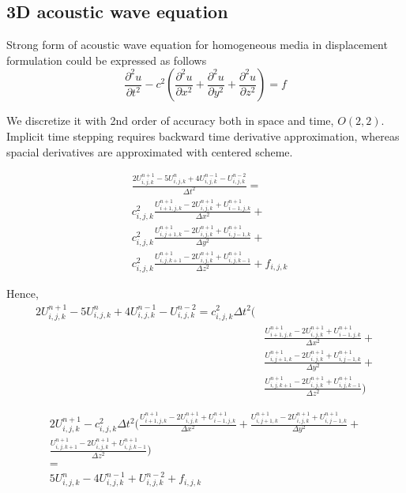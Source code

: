 \documentclass[12pt,a4paper]{report}
\begin{document}
\subsection*{3D acoustic wave equation}
Strong form of acoustic wave equation for homogeneous media in displacement formulation could be expressed as follows
\begin{equation}
\frac{\partial^2 u}{\partial t^2} - c^2 \left(\frac{\partial^2 u}{\partial x^2} + \frac{\partial^2 u}{\partial y^2} + \frac{\partial^2 u}{\partial z^2}\right) = f
\label{eq:ac}
\end{equation}

We discretize it with 2nd order of accuracy both in space and time, $O\left(2,2\right)$. Implicit time stepping requires backward time derivative approximation, whereas spacial derivatives are approximated with centered scheme.

\begin{equation}
\begin{aligned}
&\frac{2 U^{n+1}_{i,j,k} - 5 U^{n}_{i,j,k} + 4 U^{n-1}_{i,j,k} - U^{n-2}_{i,j,k}}{\Delta t^2} = \\
& c^2_{i,j,k} \frac{U^{n+1}_{i+1,j,k} - 2 U^{n+1}_{i,j,k} + U^{n+1}_{i-1,j,k}}{\Delta x^2} +\\
& c^2_{i,j,k} \frac{U^{n+1}_{i,j+1,k} - 2 U^{n+1}_{i,j,k} + U^{n+1}_{i,j-1,k}}{\Delta y^2} + \\
& c^2_{i,j,k} \frac{U^{n+1}_{i,j,k+1} - 2 U^{n+1}_{i,j,k} + U^{n+1}_{i,j,k-1}}{\Delta z^2} + f_{i,j,k}
\end{aligned}
\end{equation}

Hence,
\begin{equation}
\begin{aligned}
2 U^{n+1}_{i,j,k} - 5 U^{n}_{i,j,k} + 4 U^{n-1}_{i,j,k} - U^{n-2}_{i,j,k} = c^2_{i,j,k} \Delta t^2 (\\
& \frac{U^{n+1}_{i+1,j,k} - 2 U^{n+1}_{i,j,k} + U^{n+1}_{i-1,j,k}}{\Delta x^2} +\\
& \frac{U^{n+1}_{i,j+1,k} - 2 U^{n+1}_{i,j,k} + U^{n+1}_{i,j-1,k}}{\Delta y^2} + \\
& \frac{U^{n+1}_{i,j,k+1} - 2 U^{n+1}_{i,j,k} + U^{n+1}_{i,j,k-1}}{\Delta z^2} )
\end{aligned}
\end{equation}

\begin{equation}
\begin{aligned}
2 U^{n+1}_{i,j,k} - c^2_{i,j,k} \Delta t^2 (
\frac{U^{n+1}_{i+1,j,k} - 2 U^{n+1}_{i,j,k} + U^{n+1}_{i-1,j,k}}{\Delta x^2} +
\frac{U^{n+1}_{i,j+1,k} - 2 U^{n+1}_{i,j,k} + U^{n+1}_{i,j-1,k}}{\Delta y^2} + \\
\frac{U^{n+1}_{i,j,k+1} - 2 U^{n+1}_{i,j,k} + U^{n+1}_{i,j,k-1}}{\Delta z^2} ) \\= \\ 5 U^{n}_{i,j,k} - 4 U^{n-1}_{i,j,k} + U^{n-2}_{i,j,k} + f_{i,j,k}
\end{aligned}
\end{equation}
\fi
\end{document}
